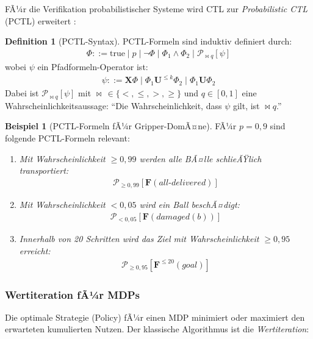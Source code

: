 ﻿\documentclass[a4paper,12pt]{article}
\theoremstyle{definition}
\newtheorem{definition}{Definition}[section]
\newtheorem{beispiel}{Beispiel}[section]
\begin{document}
FÃ¼r die Verifikation probabilistischer Systeme wird CTL zur \emph{Probabilistic CTL} (PCTL) erweitert \cite{baier2008}:

\begin{definition}[PCTL-Syntax]
PCTL-Formeln sind induktiv definiert durch:
\begin{align}
  \Phi ::= \text{true} \mid p \mid \neg\Phi \mid \Phi_1 \land \Phi_2 \mid \mathcal{P}_{\bowtie q}[\psi]
\end{align}
wobei $\psi$ ein Pfadformeln-Operator ist:
\begin{align}
  \psi ::= \mathbf{X}\Phi \mid \Phi_1 \mathbf{U}^{\leq k} \Phi_2 \mid \Phi_1 \mathbf{U} \Phi_2
\end{align}
Dabei ist $\mathcal{P}_{\bowtie q}[\psi]$ mit $\bowtie\, \in \{<, \leq, >, \geq\}$ und $q \in [0,1]$ eine Wahrscheinlichkeitsaussage: ``Die Wahrscheinlichkeit, dass $\psi$ gilt, ist $\bowtie q$.''
\end{definition}

\begin{beispiel}[PCTL-Formeln fÃ¼r Gripper-DomÃ¤ne]
FÃ¼r $p = 0{,}9$ sind folgende PCTL-Formeln relevant:
\begin{enumerate}
  \item \textit{Mit Wahrscheinlichkeit $\geq 0{,}99$ werden alle BÃ¤lle schlieÃŸlich transportiert:}
  \begin{align}
    \mathcal{P}_{\geq 0{,}99}[\mathbf{F}(\mathit{all\text{-}delivered})]
  \end{align}
  \item \textit{Mit Wahrscheinlichkeit $< 0{,}05$ wird ein Ball beschÃ¤digt:}
  \begin{align}
    \mathcal{P}_{< 0{,}05}[\mathbf{F}(\mathit{damaged}(b))]
  \end{align}
  \item \textit{Innerhalb von 20 Schritten wird das Ziel mit Wahrscheinlichkeit $\geq 0{,}95$ erreicht:}
  \begin{align}
    \mathcal{P}_{\geq 0{,}95}[\mathbf{F}^{\leq 20}(\mathit{goal})]
  \end{align}
\end{enumerate}
\end{beispiel}

\subsubsection{Wertiteration fÃ¼r MDPs}

Die optimale Strategie (Policy) fÃ¼r einen MDP minimiert oder maximiert den erwarteten kumulierten Nutzen. Der klassische Algorithmus ist die \emph{Wertiteration}:
\end{document}
